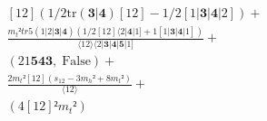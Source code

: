 \documentclass[varwidth, border=5pt]{standalone}
\newcommand{\tr}{\text{tr}}
\begin{document}
\begin{my}
$\begin{gathered}
\scriptscriptstyle [12](1/2\tr(𝟑|𝟒)[12]-1/2[1|𝟑|𝟒|2]) +\\
\scriptscriptstyle\frac{m_t²tr5(1|2|𝟑|𝟒)(1/2[12]⟨2|𝟒|1]+1[1|𝟑|𝟒|1])}{⟨12⟩⟨2|𝟑|𝟒|𝟓|1]} +\\
\scriptscriptstyle(21𝟓𝟒𝟑,\;\text{False}) +\\
\scriptscriptstyle\frac{2m_t²[12](s_{12}-3m_h²+8m_t²)}{⟨12⟩} +\\
\scriptscriptstyle (4[12]²m_t²) \phantom{+}
\end{gathered}$
\end{my}
\end{document}
